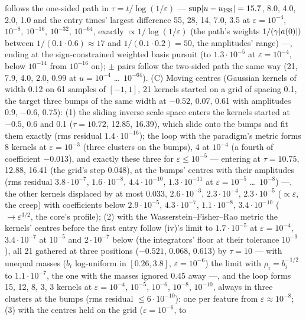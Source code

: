 \begin{sloppypar}
follows the one-sided path in $\tau = t/\log(1/\varepsilon)$ --- $\sup\lvert u - u_{\mathrm{ISS}}\rvert = 15.7$, 8.0, 4.0,
2.0, 1.0 and the entry times' largest difference 55, 28, 14, 7.0, 3.5 at $\varepsilon = 10^{-4}$, $10^{-8}$,
$10^{-16}$, $10^{-32}$, $10^{-64}$, exactly $\propto1/\log(1/\varepsilon)$ (the path's weights
$1/(\gamma\lvert a(0)\rvert)$ between $1/(0.1\cdot0.6)\approx17$ and $1/(0.1\cdot0.2) = 50$, the amplitudes' range) ---, ending at the sign-constrained weighted basis pursuit (to $1.3\cdot10^{-5}$ at
$\varepsilon = 10^{-4}$, below $10^{-14}$ from $10^{-16}$ on); $\pm$ pairs follow the two-sided path the same way (21,
7.9, 4.0, 2.0, 0.99 at $u = 10^{-4}$ \dots\ $10^{-64}$). (C) Moving centres (Gaussian kernels of width 0.12 on 61
samples of $[-1,1]$, 21 kernels started on a grid of spacing 0.1, the target three bumps of the same width at $-0.52$,
0.07, 0.61 with amplitudes 0.9, $-0.6$, 0.75): (1) the sliding inverse scale space enters the kernels started at
$-0.5$, 0.6 and 0.1 ($\tau = 10.72$, 12.85, 16.39), which slide onto the bumps and fit them exactly (rms residual
$1.4\cdot10^{-16}$); the loop with the paradigm's metric forms 8 kernels at $\varepsilon = 10^{-3}$ (three clusters on
the bumps), 4 at $10^{-4}$ (a fourth of coefficient $-0.013$), and exactly these three for $\varepsilon\le10^{-5}$ ---
entering at $\tau = 10.75$, 12.88, 16.41 (the grid's step 0.048), at the bumps' centres with their amplitudes (rms
residual $3.8\cdot10^{-7}$, $1.6\cdot10^{-8}$, $4.4\cdot10^{-10}$, $1.3\cdot10^{-11}$ at $\varepsilon = 10^{-5}$ \dots\
$10^{-8}$) ---, the other kernels displaced by at most 0.033, $2.6\cdot10^{-3}$, $2.3\cdot10^{-4}$, $2.3\cdot10^{-5}$
($\propto\varepsilon$, the creep) with coefficients below $2.9\cdot10^{-5}$, $4.3\cdot10^{-7}$, $1.1\cdot10^{-8}$,
$3.4\cdot10^{-10}$ ($\to\varepsilon^{3/2}$, the core's profile); (2) with the Wasserstein--Fisher--Rao metric the
kernels' centres before the first entry follow (iv)'s limit to $1.7\cdot10^{-5}$ at $\varepsilon = 10^{-4}$,
$3.4\cdot10^{-7}$ at $10^{-5}$ and $2\cdot10^{-7}$ below (the integrators' floor at their tolerance $10^{-9}$), all 21
gathered at three positions ($-0.521$, 0.068, 0.613) by $\tau = 10$ --- with unequal masses ($b_i$ log-uniform in
$[0.26,3.8]$, $\varepsilon = 10^{-6}$) the limit with $\rho_i = b_i^{-1/2}$ to $1.1\cdot10^{-7}$, the one with the
masses ignored 0.45 away ---, and the loop forms 15, 12, 8, 3, 3 kernels at $\varepsilon = 10^{-4}$, $10^{-5}$,
$10^{-6}$, $10^{-8}$, $10^{-10}$, always in three clusters at the bumps (rms residual $\le6\cdot10^{-10}$): one per
feature from $\varepsilon\approx10^{-8}$; (3) with the centres held on the grid ($\varepsilon = 10^{-6}$, to

\end{sloppypar}
